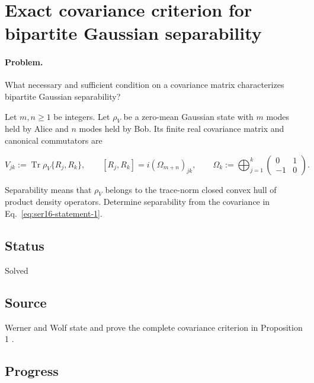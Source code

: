 \section{Exact covariance criterion for bipartite Gaussian separability}
\label{sec:op_f408a3c300b9b214}

\paragraph{Problem.}
What necessary and sufficient condition on a covariance matrix characterizes bipartite Gaussian separability?

Let $m,n\geq1$ be integers. Let $\rho_V$ be a zero-mean Gaussian state with $m$ modes held by Alice and $n$ modes held by Bob. Its finite real covariance matrix and canonical commutators are

\begin{equation}
V_{jk}:=\operatorname{Tr}\rho_V\{R_j,R_k\},\qquad
[R_j,R_k]=i(\Omega_{m+n})_{jk},\qquad
\Omega_k:=\bigoplus_{j=1}^{k}\begin{pmatrix}0&1\\-1&0\end{pmatrix}.
\label{eq:ser16-statement-1}
\end{equation}

Separability means that $\rho_V$ belongs to the trace-norm closed convex hull of product density operators. Determine separability from the covariance in Eq.~\eqref{eq:ser16-statement-1}.

\subsection*{Status}

Solved

\subsection*{Source}

Werner and Wolf state and prove the complete covariance criterion in Proposition 1 .

\subsection*{Progress}

